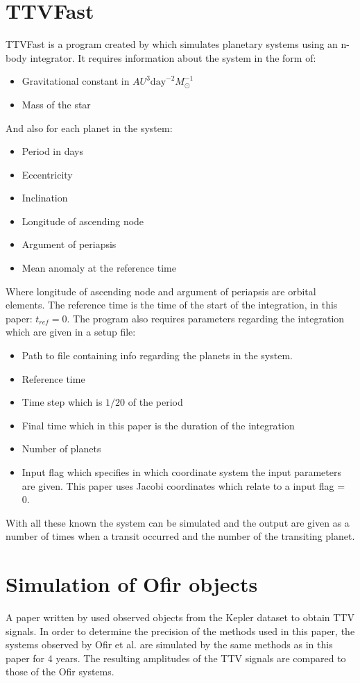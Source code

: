 \documentclass[12pt]{report}
\begin{document}
\section{TTVFast}
\label{TTVFast_method}
	TTVFast is a program created by \cite{2014ApJ...787..132D} which simulates planetary systems using an n-body integrator. It requires information about the system in the form of:
	\begin{itemize}
		\item Gravitational constant in $AU^3 \mathrm{day}^{-2}M_{\odot}^{-1}$
		\item Mass of the star 
	\end{itemize}
	And also for each planet in the system:
	\begin{itemize}
		\item Period in days 
		\item Eccentricity
		\item Inclination 
		\item Longitude of ascending node
		\item Argument of periapsis 
		\item Mean anomaly at the reference time 
	\end{itemize}
	Where longitude of ascending node and argument of periapsis are orbital elements. The reference time is the time of the start of the integration, in this paper: $t_{ref}=0$. The program also requires parameters regarding the integration which are given in a setup file:
	\begin{itemize}
		\item Path to file containing info regarding the planets in the system.
		\item Reference time
		\item Time step which is $1/20$ of the period
		\item Final time which in this paper is the duration of the integration
		\item Number of planets
		\item Input flag which specifies in which coordinate system the input parameters are given. This paper uses Jacobi coordinates which relate to a input flag = 0.
	\end{itemize}
	With all these known the system can be simulated and the output are given as a number of times when a transit occurred and the number of the transiting planet.
\section{Simulation of Ofir objects}
	A paper written by \cite{2018ApJS..234....9O} used observed objects from the Kepler dataset to obtain TTV signals. In order to determine the precision of the methods used in this paper, the systems observed by Ofir et al. are simulated by the same methods as in this paper for 4 years. The resulting amplitudes of the TTV signals are compared to those of the Ofir systems.
\end{document}
